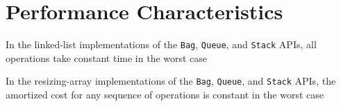 \documentclass[8pt,a4paper,compress]{beamer}
\begin{document}
\section{Performance Characteristics}
\begin{frame}[fragile]
\pause

In the linked-list implementations of the \lstinline{Bag}, \lstinline{Queue}, and \lstinline{Stack} APIs, all operations take constant time in the worst case

\pause
\bigskip

In the resizing-array implementations of the \lstinline{Bag}, \lstinline{Queue}, and \lstinline{Stack} APIs, the amortized cost for any sequence of operations is constant in the worst case
\end{frame}
\end{document}
